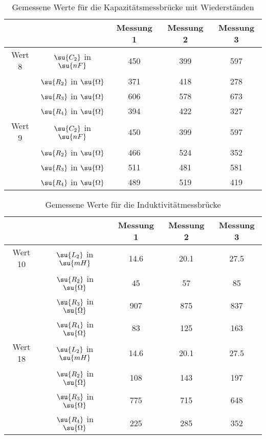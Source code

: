 \begin{table}
  \centering
  \caption{Gemessene Werte für die Kapazitätsmessbrücke mit Wiederständen}
  \label{tab:Kapazitätmit}
  \begin{tabular}{ c c c c c}
    \toprule
    & & Messung 1 & Messung 2 & Messung 3 \\
    \midrule
    Wert 8 & \multicolumn{1}{c|}{$\su{C_2}$  in  $\su{nF}     $ } & 450 & 399 & 597 \\
           & \multicolumn{1}{c|}{$\su{R_2}$  in  $\su{\Omega} $ } & 371 & 418 & 278 \\
           & \multicolumn{1}{c|}{$\su{R_3}$  in  $\su{\Omega} $ } & 606 & 578 & 673 \\
           & \multicolumn{1}{c|}{$\su{R_4}$  in  $\su{\Omega} $ } & 394 & 422 & 327 \\
    \midrule
    Wert 9 & \multicolumn{1}{c|}{$\su{C_2}$  in  $\su{nF}     $ } & 450 & 399 & 597 \\
           & \multicolumn{1}{c|}{$\su{R_2}$  in  $\su{\Omega} $ } & 466 & 524 & 352 \\
           & \multicolumn{1}{c|}{$\su{R_3}$  in  $\su{\Omega} $ } & 511 & 481 & 581 \\
           & \multicolumn{1}{c|}{$\su{R_4}$  in  $\su{\Omega} $ } & 489 & 519 & 419 \\
    \bottomrule
  \end{tabular}
\end{table}


\begin{table}
  \centering
  \caption{Gemessene Werte für die Induktivitätmessbrücke}
  \label{tab:Induktivitätsmessbrücke}
  \begin{tabular}{ c c c c c}
    \toprule
    & & Messung 1 & Messung 2 & Messung 3 \\
    \midrule
    Wert 10 & \multicolumn{1}{c|}{$\su{L_2}$  in  $\su{mH}     $ } & 14.6 & 20.1 & 27.5 \\
            & \multicolumn{1}{c|}{$\su{R_2}$  in  $\su{\Omega} $ } & 45  & 57  & 85  \\
            & \multicolumn{1}{c|}{$\su{R_3}$  in  $\su{\Omega} $ } & 907 & 875 & 837 \\
            & \multicolumn{1}{c|}{$\su{R_4}$  in  $\su{\Omega} $ } & 83  & 125 & 163 \\
    \midrule
    Wert 18 & \multicolumn{1}{c|}{$\su{L_2}$  in  $\su{mH}     $ } & 14.6 & 20.1 & 27.5 \\
            & \multicolumn{1}{c|}{$\su{R_2}$  in  $\su{\Omega} $ } & 108 & 143 & 197 \\
            & \multicolumn{1}{c|}{$\su{R_3}$  in  $\su{\Omega} $ } & 775 & 715 & 648 \\
            & \multicolumn{1}{c|}{$\su{R_4}$  in  $\su{\Omega} $ } & 225 & 285 & 352 \\
    \bottomrule
  \end{tabular}
\end{table}


